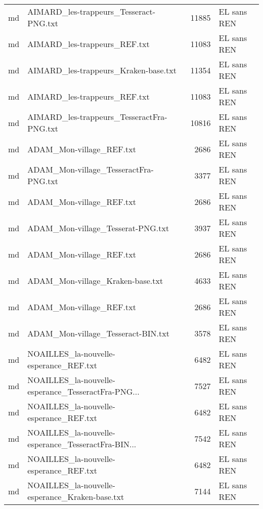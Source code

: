 \begin{tabular}{llrl}
    md &             AIMARD\_les-trappeurs\_Tesseract-PNG.txt &                 11885 & EL sans REN \\
    md &                       AIMARD\_les-trappeurs\_REF.txt &                 11083 & EL sans REN \\
    md &               AIMARD\_les-trappeurs\_Kraken-base.txt &                 11354 & EL sans REN \\
    md &                       AIMARD\_les-trappeurs\_REF.txt &                 11083 & EL sans REN \\
    md &          AIMARD\_les-trappeurs\_TesseractFra-PNG.txt &                 10816 & EL sans REN \\
    md &                           ADAM\_Mon-village\_REF.txt &                  2686 & EL sans REN \\
    md &              ADAM\_Mon-village\_TesseractFra-PNG.txt &                  3377 & EL sans REN \\
    md &                           ADAM\_Mon-village\_REF.txt &                  2686 & EL sans REN \\
    md &                  ADAM\_Mon-village\_Tesserat-PNG.txt &                  3937 & EL sans REN \\
    md &                           ADAM\_Mon-village\_REF.txt &                  2686 & EL sans REN \\
    md &                   ADAM\_Mon-village\_Kraken-base.txt &                  4633 & EL sans REN \\
    md &                           ADAM\_Mon-village\_REF.txt &                  2686 & EL sans REN \\
    md &                 ADAM\_Mon-village\_Tesseract-BIN.txt &                  3578 & EL sans REN \\
    md &             NOAILLES\_la-nouvelle-esperance\_REF.txt &                  6482 & EL sans REN \\
    md & NOAILLES\_la-nouvelle-esperance\_TesseractFra-PNG... &                  7527 & EL sans REN \\
    md &             NOAILLES\_la-nouvelle-esperance\_REF.txt &                  6482 & EL sans REN \\
    md & NOAILLES\_la-nouvelle-esperance\_TesseractFra-BIN... &                  7542 & EL sans REN \\
    md &             NOAILLES\_la-nouvelle-esperance\_REF.txt &                  6482 & EL sans REN \\
    md &     NOAILLES\_la-nouvelle-esperance\_Kraken-base.txt &                  7144 & EL sans REN \\

\end{tabular}
